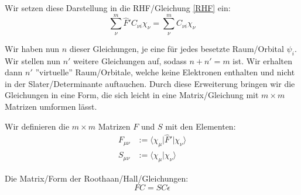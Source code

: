 Wir setzen diese Darstellung in die RHF\-/Gleichung \cref{RHF} ein:
\begin{equation}
  \sum_\nu^m \hat{F}' C_{\nu i} \chi_\nu = \sum_\nu^m C_{\nu i} \chi_\nu
\end{equation}

Wir haben nun $n$ dieser Gleichungen, je eine für jedes besetzte Raum\-/Orbital $\psi_i$.
Wir stellen nun $n'$ weitere Gleichungen auf, sodass $n + n' = m$ ist.
Wir erhalten dann $n'$ ''virtuelle'' Raum\-/Orbitale, welche keine Elektronen enthalten und
nicht in der Slater\-/Determinante auftauchen.
Durch diese Erweiterung bringen wir die Gleichungen in eine Form,
die sich leicht in eine Matrix\-/Gleichung mit $m\times m$ Matrizen umformen lässt.

Wir definieren die $m\times m$ Matrizen $F$ und $S$ mit den Elementen:
\begin{align}
  F_{\mu \nu} &:= \langle \chi_\mu \vert \hat{F}' \vert \chi_\nu \rangle\\
  S_{\mu \nu} &:= \langle \chi_\mu \vert \chi_\nu \rangle
\end{align}

Die Matrix\-/Form der Roothaan\-/Hall\-/Gleichungen:
\begin{equation} \label{roothaan_mtx}
  FC = SC\epsilon
\end{equation}

